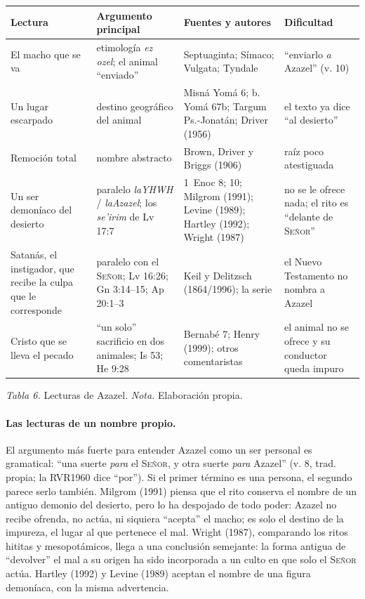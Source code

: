 \documentclass[11pt,letterpaper]{article}
\newcommand{\SENOR}{\textsc{Señor}}
\begin{document}
\begin{center}\small\renewcommand{\arraystretch}{1.2}
\begin{tabular}{@{}L{2.9cm}L{4.6cm}L{3.8cm}L{3.5cm}@{}}
\toprule
\textbf{Lectura} & \textbf{Argumento principal} & \textbf{Fuentes y autores} & \textbf{Dificultad} \\ \midrule
El macho que se va & etimología \emph{ez ozel}; el animal ``enviado'' & Septuaginta; Símaco; Vulgata; Tyndale & ``enviarlo \emph{a} Azazel'' (v. 10) \\
Un lugar escarpado & destino geográfico del animal & Misná Yomá 6; b. Yomá 67b; Targum Ps.-Jonatán; Driver (1956) & el texto ya dice ``al desierto'' \\
Remoción total & nombre abstracto & Brown, Driver y Briggs (1906) & raíz poco atestiguada \\
Un ser demoníaco del desierto & paralelo \emph{laYHWH} / \emph{laAzazel}; los \emph{se'irim} de Lv 17:7 & 1~Enoc 8; 10; Milgrom (1991); Levine (1989); Hartley (1992); Wright (1987) & no se le ofrece nada; el rito es ``delante de \SENOR'' \\
Satanás, el instigador, que recibe la culpa que le corresponde & paralelo con el \SENOR; Lv 16:26; Gn 3:14--15; Ap 20:1--3 & Keil y Delitzsch (1864/1996); la serie & el Nuevo Testamento no nombra a Azazel \\
Cristo que se lleva el pecado & ``un solo'' sacrificio en dos animales; Is 53; He 9:28 & Bernabé 7; Henry (1999); otros comentaristas & el animal no se ofrece y su conductor queda impuro \\
\bottomrule
\end{tabular}\par
{\footnotesize\color{sepia}\textit{Tabla 6.} Lecturas de Azazel. \textit{Nota.} Elaboración propia.}
\end{center}

\paragraph{Las lecturas de un nombre propio.} El argumento más fuerte para entender Azazel como un ser personal es gramatical: ``una suerte \emph{para} el \SENOR, y otra suerte \emph{para} Azazel'' (v. 8, trad. propia; la RVR1960 dice ``por''). Si el primer término es una persona, el segundo parece serlo también. Milgrom (1991) piensa que el rito conserva el nombre de un antiguo demonio del desierto, pero lo ha despojado de todo poder: Azazel no recibe ofrenda, no actúa, ni siquiera ``acepta'' el macho; es solo el destino de la impureza, el lugar al que pertenece el mal. Wright (1987), comparando los ritos hititas y mesopotámicos, llega a una conclusión semejante: la forma antigua de ``devolver'' el mal a su origen ha sido incorporada a un culto en que solo el \SENOR{} actúa. Hartley (1992) y Levine (1989) aceptan el nombre de una figura demoníaca, con la misma advertencia.
\end{document}
